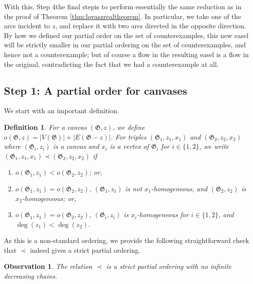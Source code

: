 \documentclass{article}
\newcommand\g{\mathfrak{G}}
\newtheorem{observation}[theorem]{Observation}
\newtheorem{definition}[theorem]{Definition}
\begin{document}
With this, Step 4\textemdash the final step\textemdash is to perform
essentially the same reduction as in the proof of Theorem
\ref{thm:lovaszrealtheorem}. In particular, we take one of the arcs incident to
$z$,  and replace it with two arcs directed in the opposite direction. By how
we defined our partial order on the set of counterexamples, this new easel will
be strictly smaller in our partial ordering on the set of counterexamples,  and
hence not a counterexample; but of course a flow in the resulting easel is a
flow in the original, contradicting the fact that we had a counterexample at
all.


\subsection{Step 1: A partial order for canvases}
We start with an important definition. 
\begin{definition}
\label{def:ordering}
For a canvas $(\g, z)$, we define $o(\g,z)=|V(\g)|+|E(\g-z)|$. For triples $(\g_1,z_1,x_1)$ and $(\g_2,z_2,x_2)$ where $(\g_i,z_i)$ is a canvas and $x_i$ is a vertex of $\g_i$ for $i\in\{1,2\}$, we write $(\g_1,z_1,x_1)\prec (\g_2,z_2,x_2)$ if
\begin{enumerate}
\item $o(\g_1,z_1)<o(\g_2,z_2)$; or,
\item $o(\g_1,z_1)=o(\g_2,z_2)$, $(\g_1,z_1)$ is not $x_1$-homogeneous, and $(\g_2,z_2)$ is $x_2$-homogeneous; or,
\item $o(\g_1,z_1)=o(\g_2,z_2)$, $(\g_i,z_i)$ is $x_i$-homogeneous for $i\in\{1,2\}$, and $\deg(z_1)<\deg(z_2)$.
\end{enumerate}
\end{definition}
As this is a non-standard ordering, we provide the following straightforward check that $\prec$ indeed gives a strict partial ordering.

\begin{observation}\label{obs-precord}
The relation $\prec$ is a strict partial ordering with no infinite decreasing chains.
\end{observation}
\end{document}
